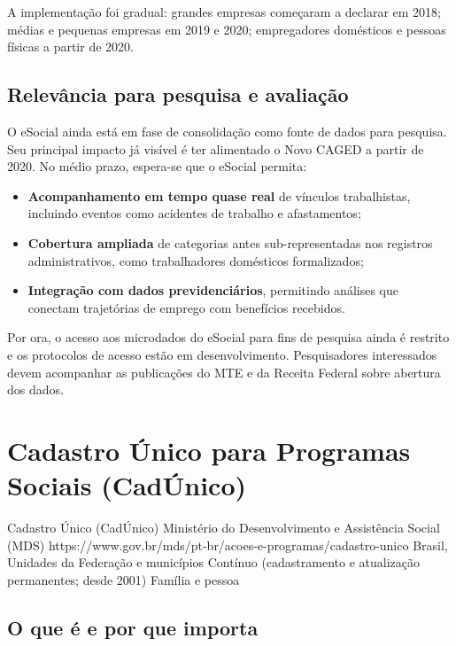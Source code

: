 A implementação foi gradual: grandes empresas começaram a declarar em 2018; médias e pequenas empresas em 2019 e 2020; empregadores domésticos e pessoas físicas a partir de 2020.

\subsection{Relevância para pesquisa e avaliação}

O eSocial ainda está em fase de consolidação como fonte de dados para pesquisa. Seu principal impacto já visível é ter alimentado o Novo CAGED a partir de 2020. No médio prazo, espera-se que o eSocial permita:

\begin{itemize}
  \item \textbf{Acompanhamento em tempo quase real} de vínculos trabalhistas, incluindo eventos como acidentes de trabalho e afastamentos;
  \item \textbf{Cobertura ampliada} de categorias antes sub-representadas nos registros administrativos, como trabalhadores domésticos formalizados;
  \item \textbf{Integração com dados previdenciários}, permitindo análises que conectam trajetórias de emprego com benefícios recebidos.
\end{itemize}

Por ora, o acesso aos microdados do eSocial para fins de pesquisa ainda é restrito e os protocolos de acesso estão em desenvolvimento. Pesquisadores interessados devem acompanhar as publicações do MTE e da Receita Federal sobre abertura dos dados.

\section{Cadastro Único para Programas Sociais (CadÚnico)}

\ficharapida
  {Cadastro Único (CadÚnico)}
  {Ministério do Desenvolvimento e Assistência Social (MDS)}
  {https://www.gov.br/mds/pt-br/acoes-e-programas/cadastro-unico}
  {Brasil, Unidades da Federação e municípios}
  {Contínuo (cadastramento e atualização permanentes; desde 2001)}
  {Família e pessoa}

\subsection{O que é e por que importa}

